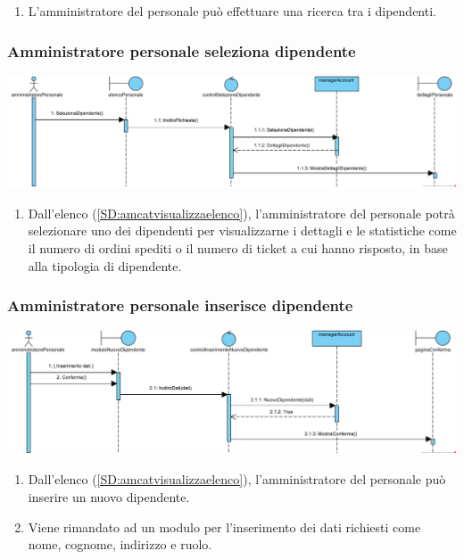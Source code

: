 \documentclass[12pt,a4paper]{article}
\begin{document}
\begin{enumerate}
\item L'amministratore del personale può effettuare una ricerca tra i dipendenti.
\end{enumerate}

\subsubsection{Amministratore personale seleziona dipendente}
\label{SD:amperselezione}
\begin{center}
\includegraphics[width=\textwidth]{SequenceDiagram/AmministratorePersonaleDipendenteSeleziona}
\end{center}

\begin{enumerate}
\item Dall'elenco (\ref{SD:amcatvisualizzaelenco}), l'amministratore del personale potrà selezionare uno dei dipendenti per visualizzarne i dettagli e le statistiche come il numero di ordini spediti o il numero di ticket a cui hanno risposto, in base alla tipologia di dipendente.
\end{enumerate}

\subsubsection{Amministratore personale inserisce dipendente}
\label{SD:amperinserisce}
\begin{center}
\includegraphics[width=\textwidth]{SequenceDiagram/AmministratorePersonaleDipendenteInserisce}
\end{center}

\begin{enumerate}
\item Dall'elenco (\ref{SD:amcatvisualizzaelenco}), l'amministratore del personale può inserire un nuovo dipendente.
\item Viene rimandato ad un modulo per l'inserimento dei dati richiesti come nome, cognome, indirizzo e ruolo.
\end{enumerate}
\end{document}
